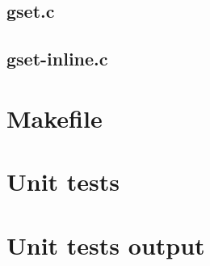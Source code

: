 \subsection{gset.c}

\begin{scriptsize}
\begin{ttfamily}

\end{ttfamily}
\end{scriptsize}

\subsection{gset-inline.c}

\begin{scriptsize}
\begin{ttfamily}

\end{ttfamily}
\end{scriptsize}

\section{Makefile}

\begin{scriptsize}
\begin{ttfamily}

\end{ttfamily}
\end{scriptsize}

\section{Unit tests}

\begin{scriptsize}
\begin{ttfamily}

\end{ttfamily}
\end{scriptsize}

\section{Unit tests output}

\begin{scriptsize}
\begin{ttfamily}

\end{ttfamily}
\end{scriptsize}

